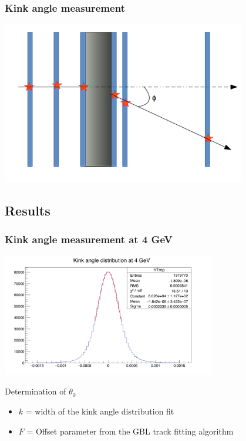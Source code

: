 \documentclass{beamer}
\begin{document}
  \begin{frame}
    \frametitle{Kink angle measurement}

    \begin{center}
      \includegraphics[width = 0.8\textwidth]{Pictures/kinkAngle.png}
    \end{center}
  \end{frame}

  \subsection{Results}

  \begin{frame}
    \frametitle{Kink angle measurement at 4 GeV}

      \begin{center}
        \includegraphics[width = 0.7\textwidth]{Pictures/kinkAngle4GeV.png}
      \end{center}
      \vspace{-0.2cm}
      \begin{block}{Determination of $\theta_0$}
        \begin{itemize}
          \item $k$ = width of the kink angle distribution fit
          \item $F$ = Offset parameter from the GBL track fitting algorithm
        \end{itemize}
      \end{block}
  \end{frame}
\end{document}
